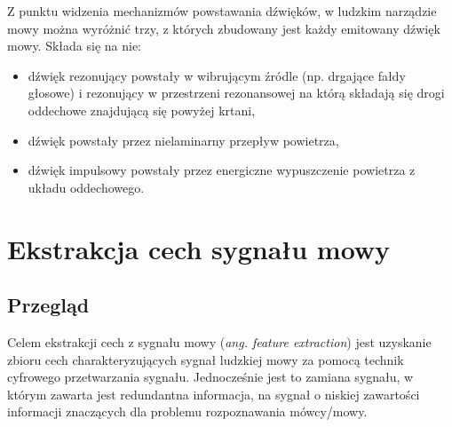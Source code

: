 Z punktu widzenia mechanizmów powstawania dźwięków, w ludzkim narządzie mowy można wyróżnić trzy, z których zbudowany jest każdy emitowany dźwięk mowy. Składa się na nie:
\begin{itemize}
\item dźwięk rezonujący powstały w wibrującym źródle (np. drgające fałdy głosowe) i rezonujący w przestrzeni rezonansowej na którą składają się drogi oddechowe znajdującą się powyżej krtani,
\item dźwięk powstały przez nielaminarny przepływ powietrza,
\item dźwięk impulsowy powstały przez energiczne wypuszczenie powietrza z układu oddechowego.
\end{itemize}

\section{Ekstrakcja cech sygnału mowy}

\label{featureextraction}
\subsection{Przegląd}
Celem ekstrakcji cech z sygnału mowy (\textit{ang. feature extraction}) jest uzyskanie zbioru cech charakteryzujących sygnał ludzkiej mowy za pomocą technik cyfrowego przetwarzania sygnału. Jednocześnie jest to zamiana sygnału, w którym zawarta jest redundantna informacja, na sygnał o niskiej zawartości informacji znaczących dla problemu rozpoznawania mówcy/mowy. 



